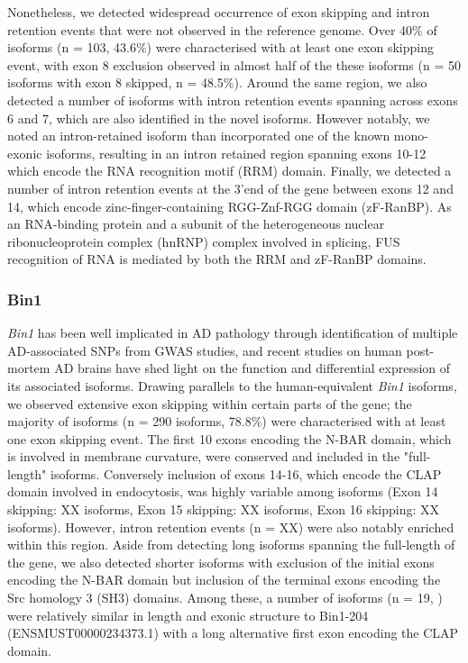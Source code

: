 Nonetheless, we detected widespread occurrence of exon skipping and intron retention events that were not observed in the reference genome. Over 40\% of isoforms (n = 103, 43.6\%) were characterised with at least one exon skipping event, with exon 8 exclusion observed in almost half of the these isoforms (n = 50 isoforms with exon 8 skipped, n = 48.5\%). Around the same region, we also detected a number of isoforms with intron retention events spanning across exons 6 and 7, which are also identified in the novel isoforms. However notably, we noted an intron-retained isoform than incorporated one of the known mono-exonic isoforms, resulting in an intron retained region spanning exons 10-12 which encode the RNA recognition motif (RRM) domain. Finally, we detected a number of intron retention events at the 3'end of the gene between exons 12 and 14, which encode zinc-finger-containing RGG-Znf-RGG domain (zF-RanBP). As an RNA-binding protein and a subunit of the heterogeneous nuclear ribonucleoprotein complex (hnRNP) complex involved in splicing, FUS recognition of RNA is mediated by both the RRM and zF-RanBP domains\cite{Wang2015c}. 

\subsubsection{Bin1}
\textit{Bin1} has been well implicated in AD pathology through identification of multiple AD-associated SNPs from GWAS studies, and recent studies on human post-mortem AD brains have shed light on the function and differential expression of its associated isoforms\cite{Taga2020}. Drawing parallels to the human-equivalent \textit{Bin1} isoforms, we observed extensive exon skipping within certain parts of the gene; the majority of isoforms (n = 290 isoforms, 78.8\%) were characterised with at least one exon skipping event. The first 10 exons encoding the N-BAR domain, which is involved in membrane curvature, were conserved and included in the "full-length" isoforms. Conversely inclusion of exons 14-16, which encode the CLAP domain involved in endocytosis, was highly variable among isoforms (Exon 14 skipping: XX isoforms, Exon 15 skipping: XX isoforms, Exon 16 skipping: XX isoforms). However, intron retention events (n = XX) were also notably enriched within this region. Aside from detecting long isoforms spanning the full-length of the gene, we also detected shorter isoforms with exclusion of the initial exons encoding the N-BAR domain but inclusion of the terminal exons encoding the Src homology 3 (SH3) domains. Among these, a number of isoforms (n = 19, ) were relatively similar in length and exonic structure to Bin1-204 (ENSMUST00000234373.1) with a long alternative first exon encoding the CLAP domain.  

